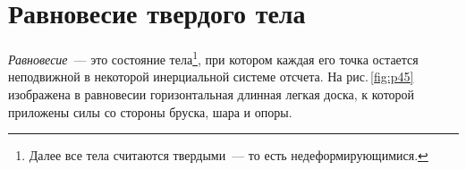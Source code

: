 \documentclass[main.tex]{subfiles}
\begin{document}



\pagestyle{empty}

 

\setcounter{section}{24
}
\addtocounter{section}{-1} 

\section{Равновесие твердого тела}

\emph{Равновесие}~--- это состояние тела\footnote{Далее все тела считаются твердыми~--- то есть недеформирующимися.}, при котором каждая его точка остается неподвижной в некоторой инерциальной системе отсчета. На рис.\,\ref{fig:p45} изображена в равновесии горизонтальная длинная легкая доска, к которой приложены силы со стороны бруска, шара и опоры. 
\end{document}
